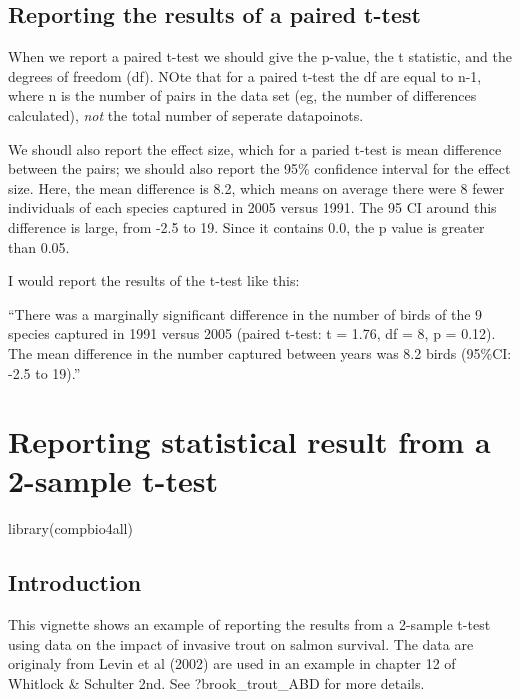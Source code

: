 \documentclass[
]{book}
\newenvironment{Shaded}{\begin{snugshade}}{\end{snugshade}}
\newcommand{\FunctionTok}[1]{\textcolor[rgb]{0.00,0.00,0.00}{#1}}
\newcommand{\NormalTok}[1]{#1}
\begin{document}
\hypertarget{reporting-the-results-of-a-paired-t-test}{%
\section{Reporting the results of a paired t-test}\label{reporting-the-results-of-a-paired-t-test}}

When we report a paired t-test we should give the p-value, the t statistic, and the degrees of freedom (df). NOte that for a paired t-test the df are equal to n-1, where n is the number of pairs in the data set (eg, the number of differences calculated), \emph{not} the total number of seperate datapoinots.

We shoudl also report the effect size, which for a paried t-test is mean difference between the pairs; we should also report the 95\% confidence interval for the effect size. Here, the mean difference is 8.2, which means on average there were 8 fewer individuals of each species captured in 2005 versus 1991. The 95 CI around this difference is large, from -2.5 to 19. Since it contains 0.0, the p value is greater than 0.05.

I would report the results of the t-test like this:

``There was a marginally significant difference in the number of birds of the 9 species captured in 1991 versus 2005 (paired t-test: t = 1.76, df = 8, p = 0.12). The mean difference in the number captured between years was 8.2 birds (95\%CI: -2.5 to 19).''

\hypertarget{reporting-statistical-result-from-a-2-sample-t-test}{%
\chapter{Reporting statistical result from a 2-sample t-test}\label{reporting-statistical-result-from-a-2-sample-t-test}}

\begin{Shaded}
\begin{Highlighting}[]
\FunctionTok{library}\NormalTok{(compbio4all)}
\end{Highlighting}
\end{Shaded}

\hypertarget{introduction-11}{%
\section{Introduction}\label{introduction-11}}

This vignette shows an example of reporting the results from a 2-sample t-test using data on the impact of invasive trout on salmon survival. The data are originaly from Levin et al (2002) are used in an example in chapter 12 of Whitlock \& Schulter 2nd. See ?brook\_trout\_ABD for more details.
\end{document}
